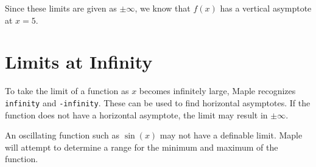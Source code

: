 \noindent
Since these limits are given as $\pm \infty$, we know that $f(x)$ has a vertical asymptote at $x=5$.

\section{Limits at Infinity}
\label{sec:limits_at_infinity}

To take the limit of a function as $x$ becomes infinitely large, Maple recognizes \texttt{infinity} and \texttt{-infinity}. These can be used to find horizontal asymptotes. If the function does not have a horizontal asymptote, the limit may result in $\pm \infty$.

\begin{maplegroup}
\begin{mapleinput}
\end{mapleinput}
\mapleresult
\begin{maplelatex}
\end{maplelatex}
\end{maplegroup}
\begin{maplegroup}
\begin{mapleinput}
\end{mapleinput}
\mapleresult
\begin{maplelatex}
\end{maplelatex}
\end{maplegroup}

\begin{maplegroup}
\begin{mapleinput}
\end{mapleinput}
\end{maplegroup}

An oscillating function such as $\sin(x)$ may not have a definable limit. Maple will attempt to determine a range for the minimum and maximum of the function.

\begin{maplegroup}
\begin{mapleinput}
\end{mapleinput}
\mapleresult
\begin{maplelatex}
\end{maplelatex}
\end{maplegroup}

